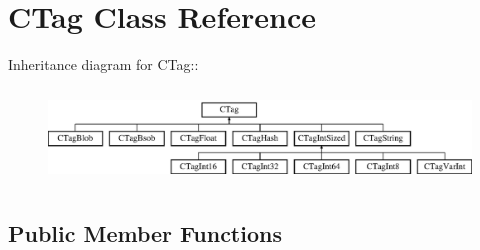 \section{CTag Class Reference}
\label{classCTag}
Inheritance diagram for CTag::\begin{figure}[H]
\begin{center}
\leavevmode
\includegraphics[height=2.55319cm]{classCTag}
\end{center}
\end{figure}
\subsection*{Public Member Functions}
